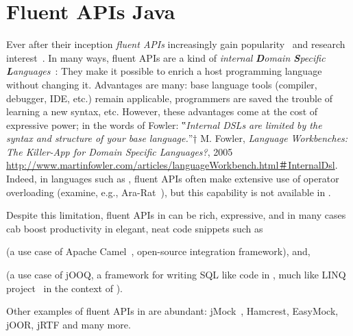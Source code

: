 \section{Fluent APIs Java}
Ever after their inception \emph{fluent APIs}
  increasingly gain popularity~\cite{Hibernate:06,Freeman:Pryce:06,Larsen:2012} and research
  interest~\cite{Deursen:2000,Kabanov:2008}.
In many ways, fluent APIs are a kind of
  \emph{internal} \emph{\textbf Domain \textbf Specific \textbf Languages}~\cite{VanDeursen:Klint:2000,Hudak:1997,Fowler:2010}:
They make it possible to enrich a host programming language without changing it.
Advantages are many: base language tools (compiler, debugger, IDE, etc.) remain
  applicable, programmers are saved the trouble of learning a new syntax, etc.
However, these advantages come at the cost of expressive power;
  in the words of Fowler:
  ‟\emph{Internal DSLs are limited by the syntax and structure of your base language.}”†
  {M. Fowler, \emph{Language Workbenches: The Killer-App for Domain Specific Languages?},
    2005
    \newline
  \url{http://www.martinfowler.com/articles/languageWorkbench.html＃InternalDsl}}.
Indeed, in languages such as \CC, fluent APIs
  often make extensive use of operator overloading (examine, e.g., \textsf{Ara-Rat}~\cite{Gil:Lenz:07}),
  but this capability is not available in \Java.

Despite this limitation, fluent APIs in \Java can be rich, expressive,
and in many cases cab boost productivity in elegant, neat code snippets such as

\begin{quote}
\end{quote}

(a use case of Apache Camel~\cite{Ibsen:Anstey:10}, open-source integration
framework), and,

\begin{quote}
\end{quote}

(a use case of jOOQ, a framework for writing SQL
like code in \Java, much like LINQ project~\cite{Meijer:Beckman:Bierman:06} in
the context of \CSharp).

Other examples of fluent APIs in \Java are abundant:
jMock~\cite{Freeman:Pryce:06},
Hamcrest,
EasyMock,
jOOR,
jRTF
and many more.

